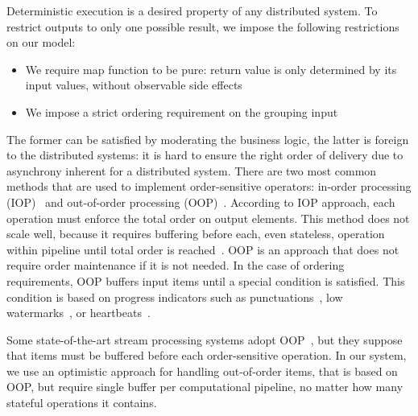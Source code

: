 \label {fs-collision}

Deterministic execution is a desired property of any distributed system. 
%
To restrict outputs to only one possible result, we impose the following  restrictions on our model: 

\begin{itemize}
  \item We require map function to be pure: return value is only determined by its input values, without observable side effects
  \item We impose a strict ordering requirement on the grouping  input
\end{itemize}

The former   can be  satisfied by moderating the  business logic, 
the latter  is foreign to the distributed systems: 
it is hard to ensure  the right order of delivery due to  asynchrony inherent for a distributed system. 
There are two most common methods that are used to implement order-sensitive operators: in-order processing (IOP)~\cite{Arasu:2006:CCQ:1146461.1146463, Cranor:2003:GSD:872757.872838} and out-of-order processing (OOP)~\cite{Li:2008:OPN:1453856.1453890}. According to IOP approach, each operation must enforce the total order on output elements. This method does not scale well, because it requires buffering before each, even stateless, operation within pipeline until total order is reached~\cite{Li:2008:OPN:1453856.1453890}. OOP is an approach that does not require order maintenance if it is not needed. In the case of ordering requirements, OOP buffers input items until a special condition is satisfied. This condition is based on progress indicators such as punctuations~\cite{Tucker:2003:EPS:776752.776780}, low watermarks~\cite{Akidau:2013:MFS:2536222.2536229}, or heartbeats~\cite{Srivastava:2004:FTM:1055558.1055596}.  

Some state-of-the-art stream processing systems adopt OOP~\cite{Carbone:2017:SMA:3137765.3137777}, but they suppose that items must be buffered before each order-sensitive operation. In our system, we use an optimistic approach for handling out-of-order items, that is based on OOP, but require single buffer per computational pipeline, no matter how many stateful operations it contains.
%
%

